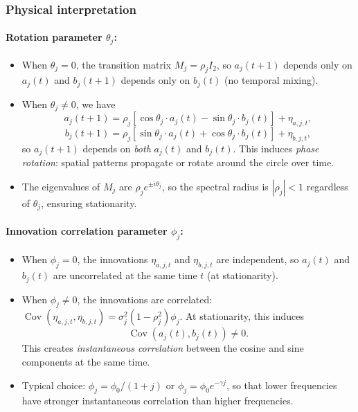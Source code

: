 \documentclass[answers,12pt,addpoints]{exam}
\begin{document}
\subsubsection*{Physical interpretation}

\paragraph{Rotation parameter $\theta_j$:}
\begin{itemize}
  \item When $\theta_j = 0$, the transition matrix $M_j = \rho_j I_2$, so $a_j(t+1)$ depends only on $a_j(t)$ and $b_j(t+1)$ depends only on $b_j(t)$ (no temporal mixing).
  \item When $\theta_j \neq 0$, we have
    \[
      a_j(t+1) = \rho_j[\cos\theta_j \cdot a_j(t) - \sin\theta_j \cdot b_j(t)] + \eta_{a,j,t},
    \]
    \[
      b_j(t+1) = \rho_j[\sin\theta_j \cdot a_j(t) + \cos\theta_j \cdot b_j(t)] + \eta_{b,j,t},
    \]
    so $a_j(t+1)$ depends on \emph{both} $a_j(t)$ and $b_j(t)$. This induces \emph{phase rotation}: spatial patterns propagate or rotate around the circle over time.
  \item The eigenvalues of $M_j$ are $\rho_j e^{\pm i\theta_j}$, so the spectral radius is $|\rho_j| < 1$ regardless of $\theta_j$, ensuring stationarity.
\end{itemize}

\paragraph{Innovation correlation parameter $\phi_j$:}
\begin{itemize}
  \item When $\phi_j = 0$, the innovations $\eta_{a,j,t}$ and $\eta_{b,j,t}$ are independent, so $a_j(t)$ and $b_j(t)$ are uncorrelated at the same time $t$ (at stationarity).
  \item When $\phi_j \neq 0$, the innovations are correlated: $\operatorname{Cov}(\eta_{a,j,t}, \eta_{b,j,t}) = \sigma_j^2(1-\rho_j^2)\phi_j$. At stationarity, this induces
    \[
      \operatorname{Cov}(a_j(t), b_j(t)) \neq 0.
    \]
    This creates \emph{instantaneous correlation} between the cosine and sine components at the same time.
  \item Typical choice: $\phi_j = \phi_0 / (1 + j)$ or $\phi_j = \phi_0 e^{-\gamma j}$, so that lower frequencies have stronger instantaneous correlation than higher frequencies.
\end{itemize}
\end{document}
